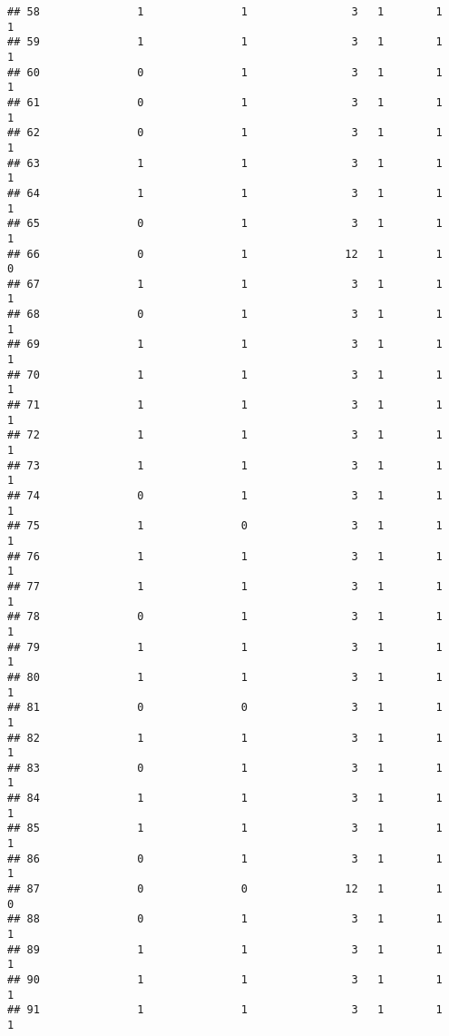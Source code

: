 \documentclass[]{article}
\begin{document}
\begin{verbatim}
## 58               1               1                3   1        1        1
## 59               1               1                3   1        1        1
## 60               0               1                3   1        1        1
## 61               0               1                3   1        1        1
## 62               0               1                3   1        1        1
## 63               1               1                3   1        1        1
## 64               1               1                3   1        1        1
## 65               0               1                3   1        1        1
## 66               0               1               12   1        1        0
## 67               1               1                3   1        1        1
## 68               0               1                3   1        1        1
## 69               1               1                3   1        1        1
## 70               1               1                3   1        1        1
## 71               1               1                3   1        1        1
## 72               1               1                3   1        1        1
## 73               1               1                3   1        1        1
## 74               0               1                3   1        1        1
## 75               1               0                3   1        1        1
## 76               1               1                3   1        1        1
## 77               1               1                3   1        1        1
## 78               0               1                3   1        1        1
## 79               1               1                3   1        1        1
## 80               1               1                3   1        1        1
## 81               0               0                3   1        1        1
## 82               1               1                3   1        1        1
## 83               0               1                3   1        1        1
## 84               1               1                3   1        1        1
## 85               1               1                3   1        1        1
## 86               0               1                3   1        1        1
## 87               0               0               12   1        1        0
## 88               0               1                3   1        1        1
## 89               1               1                3   1        1        1
## 90               1               1                3   1        1        1
## 91               1               1                3   1        1        1

\end{verbatim}
\end{document}
